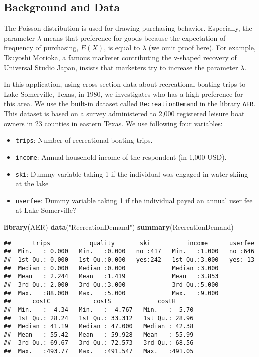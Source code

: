 \documentclass[
  12pt,
]{article}
\newenvironment{Shaded}{\begin{snugshade}}{\end{snugshade}}
\newcommand{\KeywordTok}[1]{\textcolor[rgb]{0.13,0.29,0.53}{\textbf{#1}}}
\newcommand{\NormalTok}[1]{#1}
\newcommand{\StringTok}[1]{\textcolor[rgb]{0.31,0.60,0.02}{#1}}
\providecommand{\tightlist}{%
  \setlength{\itemsep}{0pt}\setlength{\parskip}{0pt}}
\begin{document}
\hypertarget{background-and-data-2}{%
\subsection{Background and Data}\label{background-and-data-2}}

The Poisson distribution is used for drawing purchasing behavior.
Especially, the parameter \(\lambda\) means that preference for goods
because the expectation of frequency of purchasing, \(E(X)\), is equal
to \(\lambda\) (we omit proof here). For example, Tsuyoshi Morioka, a
famous marketer contributing the v-shaped recovery of Universal Studio
Japan, insists that marketers try to increase the parameter \(\lambda\).

In this application, using cross-section data about recreational boating
trips to Lake Somerville, Texas, in 1980, we investigates who has a high
preference for this area. We use the built-in dataset called
\texttt{RecreationDemand} in the library \texttt{AER}. This dataset is
based on a survey administered to 2,000 registered leisure boat owners
in 23 counties in eastern Texas. We use following four variables:

\begin{itemize}
\tightlist
\item
  \texttt{trips}: Number of recreational boating trips.
\item
  \texttt{income}: Annual household income of the respondent (in 1,000
  USD).
\item
  \texttt{ski}: Dummy variable taking 1 if the individual was engaged in
  water-skiing at the lake
\item
  \texttt{userfee}: Dummy variable taking 1 if the individual payed an
  annual user fee at Lake Somerville?
\end{itemize}

\begin{Shaded}
\begin{Highlighting}[]
\KeywordTok{library}\NormalTok{(AER)}
\KeywordTok{data}\NormalTok{(}\StringTok{"RecreationDemand"}\NormalTok{)}
\KeywordTok{summary}\NormalTok{(RecreationDemand)}
\end{Highlighting}
\end{Shaded}

\begin{verbatim}
##      trips           quality       ski          income      userfee  
##  Min.   : 0.000   Min.   :0.000   no :417   Min.   :1.000   no :646  
##  1st Qu.: 0.000   1st Qu.:0.000   yes:242   1st Qu.:3.000   yes: 13  
##  Median : 0.000   Median :0.000             Median :3.000            
##  Mean   : 2.244   Mean   :1.419             Mean   :3.853            
##  3rd Qu.: 2.000   3rd Qu.:3.000             3rd Qu.:5.000            
##  Max.   :88.000   Max.   :5.000             Max.   :9.000            
##      costC            costS             costH       
##  Min.   :  4.34   Min.   :  4.767   Min.   :  5.70  
##  1st Qu.: 28.24   1st Qu.: 33.312   1st Qu.: 28.96  
##  Median : 41.19   Median : 47.000   Median : 42.38  
##  Mean   : 55.42   Mean   : 59.928   Mean   : 55.99  
##  3rd Qu.: 69.67   3rd Qu.: 72.573   3rd Qu.: 68.56  
##  Max.   :493.77   Max.   :491.547   Max.   :491.05
\end{verbatim}
\end{document}
